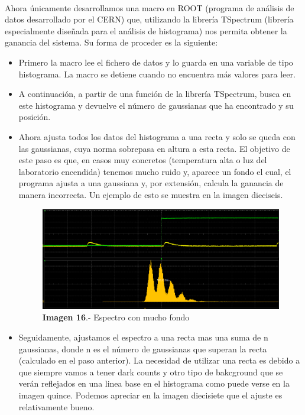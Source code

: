 \documentclass[11pt, a4paper]{article}
\begin{document}
\paragraph {}  
Ahora únicamente desarrollamos una macro en ROOT (programa de análisis de datos desarrollado por el CERN) que, utilizando la librería TSpectrum (librería especialmente diseñada para el análisis de histograma) nos permita obtener la ganancia del sistema. Su forma de proceder es la siguiente:
\begin{itemize}
\item {} Primero la macro lee el fichero de datos y lo guarda en una variable de tipo histograma. La macro se detiene cuando no encuentra más valores para leer.

\item {} A continuación, a partir de una función de la librería TSpectrum, busca en este histograma y devuelve el número de gaussianas que ha encontrado y su posición.

\item {} Ahora ajusta todos los datos del histograma a una recta y solo se queda con las gaussianas, cuya norma sobrepasa en altura a esta recta. El objetivo de este paso es que, en casos muy concretos (temperatura alta o luz del laboratorio encendida) tenemos mucho ruido y, aparece un fondo el cual, el programa ajusta a una gaussiana y, por extensión, calcula la ganancia de manera incorrecta. Un ejemplo de esto se muestra en la imagen dieciseis.

\begin{figure}[hbtp]
\centering
\includegraphics[scale=0.2]{fondogaussiano.png}
\caption{\textbf{Imagen 16}.- Espectro con mucho fondo}
\end{figure}

\newpage
\item {} Seguidamente, ajustamos el espectro a una recta mas una suma de n gaussianas, donde n es el número de gaussianas que superan la recta (calculado en el paso anterior). La necesidad de utilizar una recta es debido a que siempre vamos a tener dark counts y otro tipo de bakcground que se verán reflejados en una linea base en el histograma como puede verse en la imagen quince. Podemos apreciar en la imagen diecisiete que el ajuste es relativamente bueno.


\end{itemize}
\end{document}
